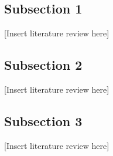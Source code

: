 \subsection{Subsection 1}
[Insert literature review here]

\subsection{Subsection 2}
[Insert literature review here]

\subsection{Subsection 3}
[Insert literature review here]

